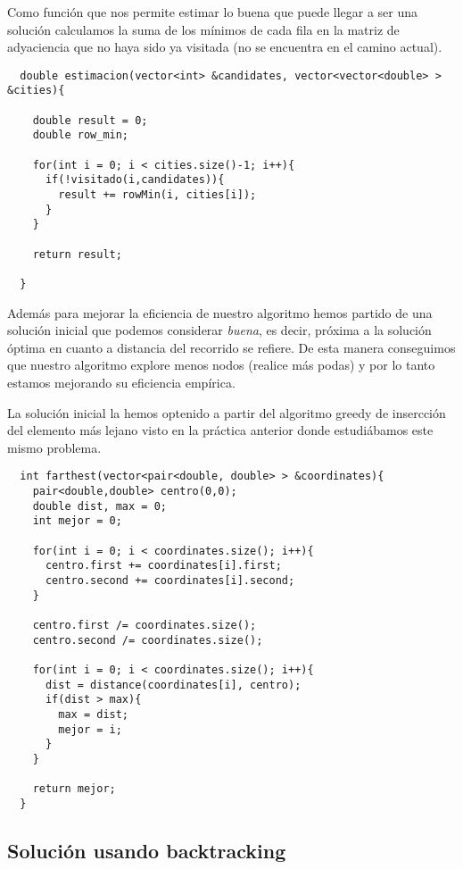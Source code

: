 \documentclass{article}
\begin{document}
Como función que nos permite estimar lo buena que puede llegar a ser
una solución calculamos la suma de los mínimos de cada fila en la
matriz de adyaciencia que no haya sido ya visitada (no se encuentra en
el camino actual).

\begin{lstlisting}
  double estimacion(vector<int> &candidates, vector<vector<double> > &cities){

    double result = 0;
    double row_min;

    for(int i = 0; i < cities.size()-1; i++){
      if(!visitado(i,candidates)){
        result += rowMin(i, cities[i]);
      }
    }

    return result;

  }
\end{lstlisting}

Además para mejorar la eficiencia de nuestro algoritmo hemos partido
de una solución inicial que podemos considerar \textit{buena}, es
decir, próxima a la solución óptima en cuanto a distancia del
recorrido se refiere. De esta manera conseguimos que nuestro algoritmo
explore menos nodos (realice más podas) y por lo tanto estamos
mejorando su eficiencia empírica.

La solución inicial la hemos optenido a partir del algoritmo greedy de
insercción del elemento más lejano visto en la práctica
anterior donde estudiábamos este mismo problema.

\begin{lstlisting}
  int farthest(vector<pair<double, double> > &coordinates){
    pair<double,double> centro(0,0);
    double dist, max = 0;
    int mejor = 0;

    for(int i = 0; i < coordinates.size(); i++){
      centro.first += coordinates[i].first;
      centro.second += coordinates[i].second;
    }
    
    centro.first /= coordinates.size();
    centro.second /= coordinates.size();
    
    for(int i = 0; i < coordinates.size(); i++){
      dist = distance(coordinates[i], centro);
      if(dist > max){
     	max = dist;
     	mejor = i;
      }
    }

    return mejor;
  }
\end{lstlisting}

\subsection{Solución usando backtracking}
\end{document}

